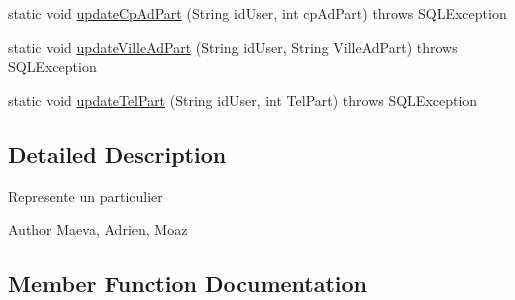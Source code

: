 \begin{DoxyCompactItemize}
\item 
static void \hyperlink{classcom_1_1ecetech_1_1bti4_1_1itproject_1_1classified_1_1dao_1_1_particulier_d_a_o_ada1b25c056da3b0e4b1fe9b9f32bbe47}{update\+Cp\+Ad\+Part} (String id\+User, int cp\+Ad\+Part)  throws S\+Q\+L\+Exception 
\item 
static void \hyperlink{classcom_1_1ecetech_1_1bti4_1_1itproject_1_1classified_1_1dao_1_1_particulier_d_a_o_aa902ab4baffe2f3d01ab2d652d084e57}{update\+Ville\+Ad\+Part} (String id\+User, String Ville\+Ad\+Part)  throws S\+Q\+L\+Exception 
\item 
static void \hyperlink{classcom_1_1ecetech_1_1bti4_1_1itproject_1_1classified_1_1dao_1_1_particulier_d_a_o_a1bf005b9911ce09d8daa26abf9fdf04e}{update\+Tel\+Part} (String id\+User, int Tel\+Part)  throws S\+Q\+L\+Exception 
\end{DoxyCompactItemize}


\subsection{Detailed Description}
Represente un particulier \begin{DoxyAuthor}{Author}
Maeva, Adrien, Moaz 
\end{DoxyAuthor}


\subsection{Member Function Documentation}
